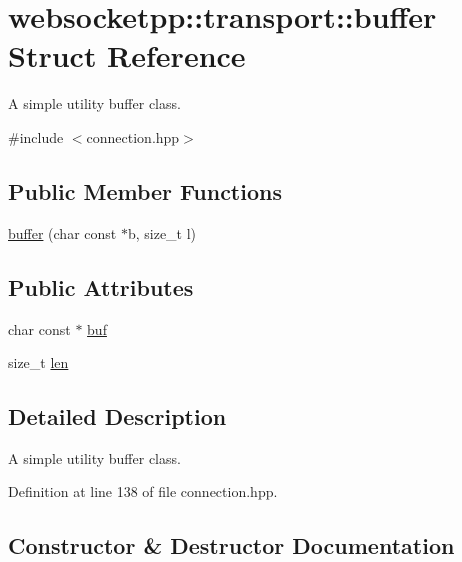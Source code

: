 \hypertarget{structwebsocketpp_1_1transport_1_1buffer}{}\section{websocketpp\+:\+:transport\+:\+:buffer Struct Reference}
\label{structwebsocketpp_1_1transport_1_1buffer}


A simple utility buffer class.  




{\ttfamily \#include $<$connection.\+hpp$>$}

\subsection*{Public Member Functions}
\begin{DoxyCompactItemize}
\item 
\hyperlink{structwebsocketpp_1_1transport_1_1buffer_a763623c638a41e3bb479b9b02c8437f2}{buffer} (char const $\ast$b, size\+\_\+t l)
\end{DoxyCompactItemize}
\subsection*{Public Attributes}
\begin{DoxyCompactItemize}
\item 
char const $\ast$ \hyperlink{structwebsocketpp_1_1transport_1_1buffer_a20572b592e33bf04ce5ffd7bced03c59}{buf}
\item 
size\+\_\+t \hyperlink{structwebsocketpp_1_1transport_1_1buffer_a89627b29fb3670a3a611ea2737d39821}{len}
\end{DoxyCompactItemize}


\subsection{Detailed Description}
A simple utility buffer class. 

Definition at line 138 of file connection.\+hpp.



\subsection{Constructor \& Destructor Documentation}
\hypertarget{structwebsocketpp_1_1transport_1_1buffer_a763623c638a41e3bb479b9b02c8437f2}{}
